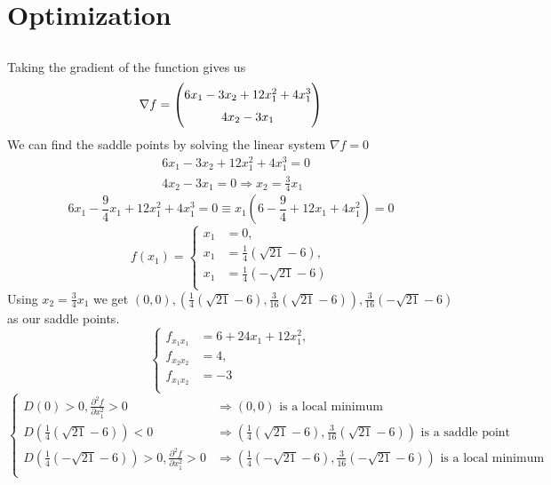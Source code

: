 \documentclass{article}
\begin{document}
\section{Optimization}
\subsection{}
Taking the gradient of the function gives us
\begin{equation}
    \nabla f = 
    \begingroup
    \renewcommand*{\arraystretch}{1.5}
    \begin{pmatrix}
    6x_1 - 3x_2 + 12x^{2}_1 + 4x^{3}_1 \\ 
    4x_{2} - 3x_1
    \end{pmatrix}
    \endgroup
\end{equation}
We can find the saddle points by solving the linear system $\nabla f = 0$
\begin{align}
   &6x_1 - 3x_2 + 12x^{2}_1 + 4x^{3}_1 = 0 \\ 
    &4x_{2} - 3x_1 = 0 \Rightarrow x_2 = \frac{3}{4}x_1
\end{align}
\begin{equation}
    6x_1 - \frac{9}{4}x_1 + 12x_{1}^{2} + 4x_{1}^{3} = 0 \equiv x_1(6 - \frac{9}{4} + 12x_1 + 4x_{1}^{2}) = 0
\end{equation}
\[
f(x_1) = 
\begin{cases}
x_1 &= 0, \\
x_1 &= \frac{1}{4}(\sqrt{21} - 6),\\
x_1 &= \frac{1}{4} (-\sqrt{21} - 6)\\
\end{cases}
\]
Using $x_2 = \frac{3}{4}x_1$ we get $(0,0), (\frac{1}{4}(\sqrt{21} - 6), \frac{3}{16}(\sqrt{21} - 6)), \frac{3}{16} (-\sqrt{21} - 6)$ as our saddle points.
\[
\begin{cases}
f_{x_1x_1} &= 6 + 24x_1 + 12x_{1}^{2} , \\
f_{x_2x_2} &= 4,\\
f_{x_1x_2} &= -3\\
\end{cases}
\]
\[
\begin{cases}
D(0) > 0, \frac{\partial^2 f}{\partial x_{1}^2} > 0 & \Rightarrow (0,0) \text{ is a local minimum} \\
D(\frac{1}{4}(\sqrt{21} - 6)) < 0 & \Rightarrow (\frac{1}{4}(\sqrt{21} - 6), \frac{3}{16}(\sqrt{21} - 6)) \text{ is a saddle point} \\
D(\frac{1}{4}(-\sqrt{21} - 6)) > 0, \frac{\partial^2 f}{\partial x_{1}^2} > 0 & \Rightarrow (\frac{1}{4}(-\sqrt{21} - 6), \frac{3}{16}(-\sqrt{21} - 6)) \text{ is a local minimum} \\
\end{cases}
\]
\end{document}

